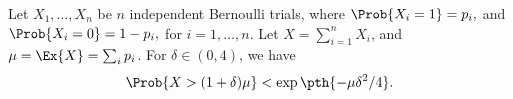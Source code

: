 \begin{lemma}
        Let $X_1, \ldots, X_n$ be $n$ independent Bernoulli trials, where
        \begin{math}
            \Prob{  X_i = 1 } =p_i,
        \end{math}
        and
        \begin{math}
            \Prob{  X_i = 0 } =1- p_i,
        \end{math}
        for $i=1,\ldots, n$.  Let $X = \sum_{i=1}^{n} X_i$, and
        $\mu = \Ex{\bigl. X} = \sum_i p_i$.  For $\delta \in (0,4)$, we have
        \begin{equation*}
            \Prob{ \bigl. X > (1+\delta)\mu } < \exp \pth{-\mu \delta^2 /
               4}.
        \end{equation*}
    \end{lemma}
